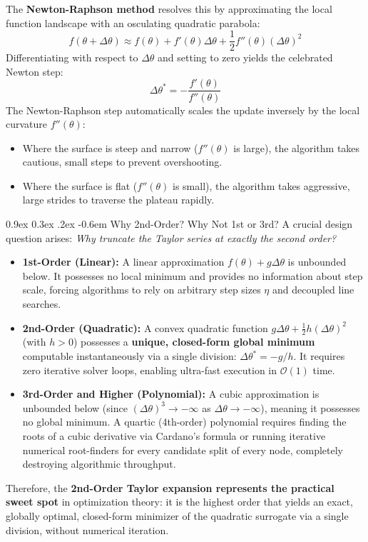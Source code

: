 \documentclass[11pt,a4paper]{article}
\makeatletter
\renewcommand\paragraph{\@startsection{paragraph}{4}{\z@}%
                                     {0.9ex \@plus0.3ex \@minus.2ex}%
                                     {-0.6em}%
                                     {\normalfont\normalsize\bfseries}}
\makeatother
\begin{document}
The \textbf{Newton-Raphson method} resolves this by approximating the local function landscape with an osculating quadratic parabola:
\begin{equation}
    f(\theta + \Delta \theta) \approx f(\theta) + f'(\theta)\Delta \theta + \frac{1}{2} f''(\theta) (\Delta \theta)^2
\end{equation}
Differentiating with respect to $\Delta \theta$ and setting to zero yields the celebrated Newton step:
\begin{equation}
    \Delta \theta^* = -\frac{f'(\theta)}{f''(\theta)}
\end{equation}
The Newton-Raphson step automatically scales the update inversely by the local curvature $f''(\theta)$:
\begin{itemize}
    \item Where the surface is steep and narrow ($f''(\theta)$ is large), the algorithm takes cautious, small steps to prevent overshooting.
    \item Where the surface is flat ($f''(\theta)$ is small), the algorithm takes aggressive, large strides to traverse the plateau rapidly.
\end{itemize}

\paragraph{Why 2nd-Order? Why Not 1st or 3rd?}
A crucial design question arises: \emph{Why truncate the Taylor series at exactly the second order?}
\begin{itemize}
    \item \textbf{1st-Order (Linear):} A linear approximation $f(\theta) + g\Delta \theta$ is unbounded below. It possesses no local minimum and provides no information about step scale, forcing algorithms to rely on arbitrary step sizes $\eta$ and decoupled line searches.
    \item \textbf{2nd-Order (Quadratic):} A convex quadratic function $g \Delta \theta + \frac{1}{2}h (\Delta \theta)^2$ (with $h > 0$) possesses a \textbf{unique, closed-form global minimum} computable instantaneously via a single division: $\Delta \theta^* = -g/h$. It requires zero iterative solver loops, enabling ultra-fast execution in $\mathcal{O}(1)$ time.
    \item \textbf{3rd-Order and Higher (Polynomial):} A cubic approximation is unbounded below (since $(\Delta \theta)^3 \to -\infty$ as $\Delta \theta \to -\infty$), meaning it possesses no global minimum. A quartic (4th-order) polynomial requires finding the roots of a cubic derivative via Cardano's formula or running iterative numerical root-finders for every candidate split of every node, completely destroying algorithmic throughput.
\end{itemize}
Therefore, the \textbf{2nd-Order Taylor expansion represents the practical sweet spot} in optimization theory: it is the highest order that yields an exact, globally optimal, closed-form minimizer of the quadratic surrogate via a single division, without numerical iteration.
\end{document}
